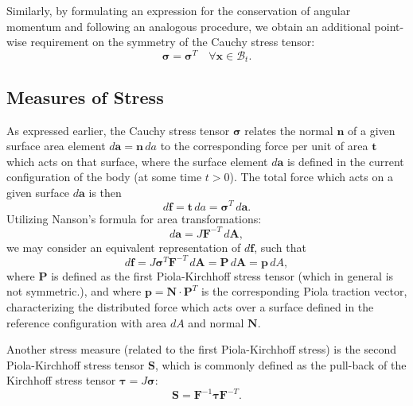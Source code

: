 Similarly, by formulating an expression for the conservation of angular momentum and following an analogous procedure, we obtain an additional point-wise requirement on the symmetry of the Cauchy stress tensor:
\begin{equation}
  \boldsymbol{\sigma} = \boldsymbol{\sigma}^T \quad \forall \mathbf{x} \in \mathcal{B}_t.
\end{equation}

\subsection{Measures of Stress}

As expressed earlier, the Cauchy stress tensor $\boldsymbol{\sigma}$ relates the normal $\mathbf{n}$ of a given surface area element $d \mathbf{a} = \mathbf{n} \, da$ to the corresponding force per unit of area $\mathbf{t}$ which acts on that surface, where the surface element $d \mathbf{a}$ is defined in the current configuration of the body (at some time $t > 0$). The total force which acts on a given surface $d \mathbf{a}$ is then
\begin{equation}
  d \mathbf{f} = \mathbf{t} \, da = \boldsymbol{\sigma}^T \, d \mathbf{a}.
\end{equation}
Utilizing Nanson's formula for area transformations:
\begin{equation}
  d \mathbf{a} = J \mathbf{F}^{-T} \, d \mathbf{A},
\end{equation}
we may consider an equivalent representation of $d \mathbf{f}$, such that
\begin{equation}
  d \mathbf{f} = J \boldsymbol{\sigma}^T \mathbf{F}^{-T} \, d \mathbf{A} = \mathbf{P} \, d \mathbf{A} = \mathbf{p} \, dA,
\end{equation}
where $\mathbf{P}$ is defined as the first Piola-Kirchhoff stress tensor (which in general is not symmetric.), and where $\mathbf{p} = \mathbf{N} \cdot \mathbf{P}^T$ is the corresponding Piola traction vector, characterizing the distributed force which acts over a surface defined in the reference configuration with area $dA$ and normal $\mathbf{N}$.

Another stress measure (related to the first Piola-Kirchhoff stress) is the second Piola-Kirchhoff stress tensor $\mathbf{S}$, which is commonly defined as the pull-back of the Kirchhoff stress tensor $\boldsymbol{\tau} = J \boldsymbol{\sigma}$:
\begin{equation}
  \mathbf{S} = \mathbf{F}^{-1} \boldsymbol{\tau} \mathbf{F}^{-T}.
\end{equation}

